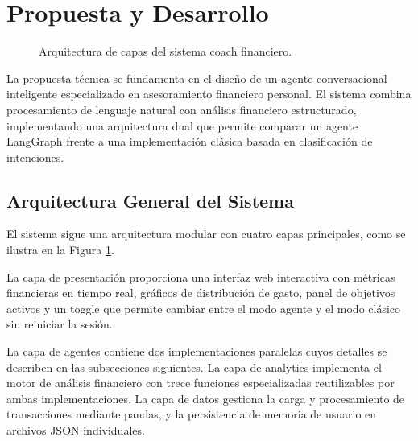 \section{Propuesta y Desarrollo}
\label{sec:propuesta}

\begin{figure}[t]
\centering
{}
\caption{Arquitectura de capas del sistema coach financiero.}
\label{fig:arquitectura_capas}
\end{figure}

La propuesta técnica se fundamenta en el diseño de un agente conversacional inteligente especializado en asesoramiento financiero personal. El sistema combina procesamiento de lenguaje natural con análisis financiero estructurado, implementando una arquitectura dual que permite comparar un agente LangGraph frente a una implementación clásica basada en clasificación de intenciones.

\subsection{Arquitectura General del Sistema}
\label{subsec:arquitectura}

El sistema sigue una arquitectura modular con cuatro capas principales, como se ilustra en la Figura \ref{fig:arquitectura_capas}.

La capa de presentación proporciona una interfaz web interactiva con métricas financieras en tiempo real, gráficos de distribución de gasto, panel de objetivos activos y un toggle que permite cambiar entre el modo agente y el modo clásico sin reiniciar la sesión.

La capa de agentes contiene dos implementaciones paralelas cuyos detalles se describen en las subsecciones siguientes. La capa de analytics implementa el motor de análisis financiero con trece funciones especializadas reutilizables por ambas implementaciones. La capa de datos gestiona la carga y procesamiento de transacciones mediante pandas, y la persistencia de memoria de usuario en archivos JSON individuales.

